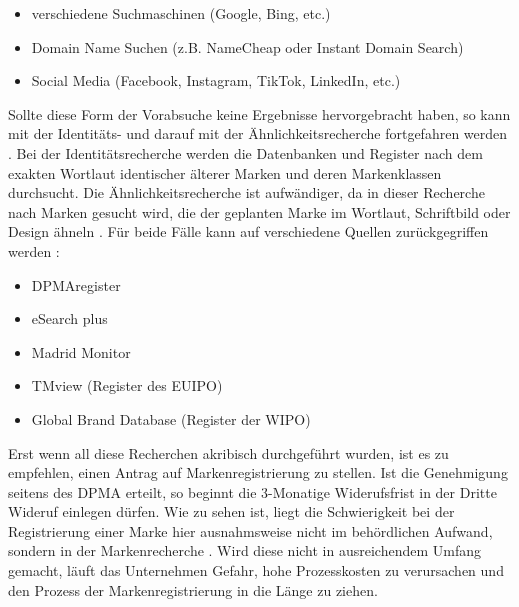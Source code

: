 \begin{itemize}
    \item verschiedene Suchmaschinen (Google, Bing, etc.)
    \item Domain Name Suchen (z.B. NameCheap oder Instant Domain Search)
    \item Social Media (Facebook, Instagram, TikTok, LinkedIn, etc.)
\end{itemize}
    
Sollte diese Form der Vorabsuche keine Ergebnisse hervorgebracht haben, so kann mit der Identitäts- und darauf mit der Ähnlichkeitsrecherche fortgefahren werden . Bei der Identitätsrecherche werden die Datenbanken und Register nach dem exakten Wortlaut identischer älterer Marken und deren Markenklassen durchsucht. Die Ähnlichkeitsrecherche ist aufwändiger, da in dieser Recherche nach Marken gesucht wird, die der geplanten Marke im Wortlaut, Schriftbild oder Design ähneln . Für beide Fälle kann auf verschiedene Quellen zurückgegriffen werden : 

\begin{itemize}
    \item DPMAregister
    \item eSearch plus
    \item Madrid Monitor
    \item TMview (Register des EUIPO)
    \item Global Brand Database (Register der WIPO)
\end{itemize}

Erst wenn all diese Recherchen akribisch durchgeführt wurden, ist es zu empfehlen, einen Antrag auf Markenregistrierung zu stellen. Ist die Genehmigung seitens des DPMA erteilt, so beginnt die 3-Monatige Widerufsfrist in der Dritte Wideruf einlegen dürfen. 
Wie zu sehen ist, liegt die Schwierigkeit bei der Registrierung einer Marke hier ausnahmsweise nicht im behördlichen Aufwand, sondern in der Markenrecherche . Wird diese nicht in ausreichendem Umfang gemacht, läuft das Unternehmen Gefahr, hohe Prozesskosten zu verursachen und den Prozess der Markenregistrierung in die Länge zu ziehen.